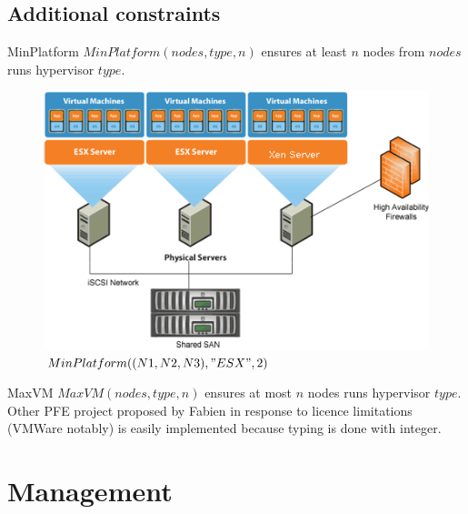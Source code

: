 \documentclass{beamer}
\begin{document}
\subsection{Additional constraints}
\begin{frame}{MinPlatform}
$MinPlatform(nodes, type, n)$ ensures at least $n$ nodes from $nodes$ runs
hypervisor $type$.
\begin{figure}[!ht]
	\centering
	\includegraphics[scale=.4]{imgs/samplecloud.png}
	\caption{$MinPlatform((N1,N2,N3), "ESX", 2)$}
\end{figure}
\end{frame}
\begin{frame}{MaxVM}
$MaxVM(nodes, type, n)$ ensures at most $n$ nodes runs hypervisor $type$.\\
\pause Other PFE project proposed by Fabien in response to licence limitations
(VMWare notably) is easily implemented because typing is done with integer.
\end{frame}

\section{Management}
\end{document}
